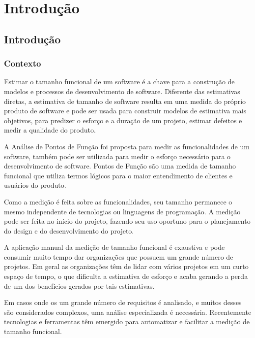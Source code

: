 \part{Introdução}

\chapter[Introdução]{Introdução}

\section{Contexto}

Estimar o tamanho funcional de um software é a chave para a construção de modelos e processos de desenvolvimento de software. Diferente das estimativas diretas, a estimativa de tamanho de software resulta em uma medida do próprio produto de software e pode ser usada para construir modelos de estimativa mais objetivos, para predizer o esforço e a duração de um projeto, estimar defeitos e medir a qualidade do produto. \cite{Ebert:2014}

A Análise de Pontos de Função foi proposta para medir as funcionalidades de um software, também pode ser utilizada para medir o esforço necessário para o desenvolvimento de software. Pontos de Função são uma medida de tamanho funcional que utiliza termos lógicos para o maior entendimento de clientes e usuários do produto. \cite{Albrecht:1994}

Como a medição é feita sobre as funcionalidades, seu tamanho permanece o mesmo independente de tecnologias ou linguagens de programação. A medição pode ser feita no início do projeto, fazendo seu uso oportuno para o planejamento do design e do desenvolvimento do projeto. \cite{Kusumoto:2002}

A aplicação manual da medição de tamanho funcional é exaustiva e pode consumir muito tempo dar organizações que possuem um grande número de projetos. Em geral as organizações têm de lidar com vários projetos em um curto espaço de tempo, o que dificulta a estimativa de esforço e acaba gerando a perda de um dos benefícios gerados por tais estimativas. \cite{Ebert:2014}


Em casos onde os um grande número de requisitos é analisado, e muitos desses são considerados complexos, uma análise especializada é necessária. Recentemente tecnologias e ferramentas têm emergido para automatizar e facilitar a medição de tamanho funcional. \cite{Ebert:2014}

